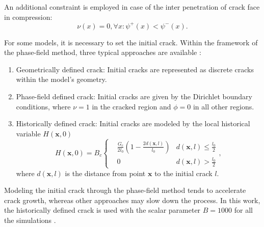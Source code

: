 An additional constraint is employed in case of the inter penetration of crack face in compression:
\begin{equation}
     \nu(x)=0, \forall x: \psi^+(x)<\psi^-(x).
\end{equation}

For some models, it is necessary to set the initial crack. Within the framework of the phase-field method, three typical approaches are available \cite{sargado_high-accuracy_2018}: 
\begin{enumerate}
    \item Geometrically defined crack: Initial cracks are represented as discrete cracks within the model's geometry.
    \item Phase-field defined crack: Initial cracks are given by the Dirichlet boundary conditions, where $\nu=1$ in the cracked region and $\phi=0$ in all other regions. 
    \item Historically defined crack: Initial cracks are modeled by the local historical variable $H(\mathbf{x},0)$
    \begin{equation}\label{historical variable}
        H(\mathbf{x},0)=B_c\left\{ 
            \begin{aligned}
                &\frac{G_c}{2l_0}(1-\frac{2d(\mathbf{x},l)}{l_0}) & d(\mathbf{x},l)\leq \frac{l_0}{2} \\
                &0 & d(\mathbf{x},l) > \frac{l_0}{2}
            \end{aligned}
         \right.,
    \end{equation}
    where $d(\mathbf{x},l)$ is the distance from point $\mathbf{x}$ to the initial crack $l$.
\end{enumerate}

Modeling the initial crack through the phase-field method tends to accelerate crack growth, whereas other approaches may slow down the process. In this work, the historically defined crack is used with the scalar parameter $B=1000$ for all the simulations \cite{borden_phase-field_2012}.